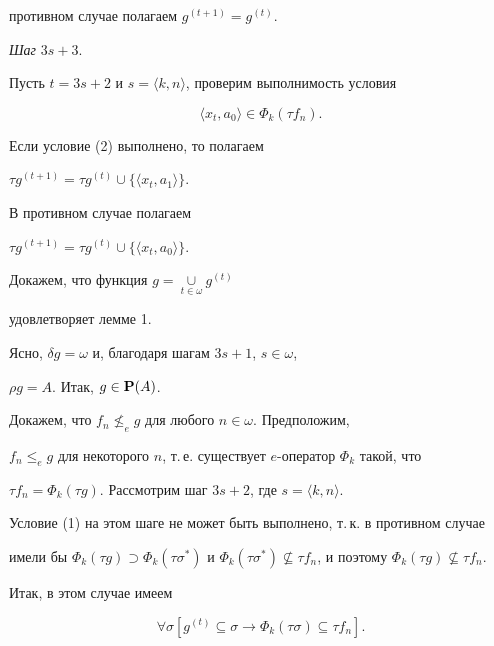 противном случае полагаем $g^{(t+1)}=g^{(t)}$.


\smallskip





{\it Шаг} $3s+3$.


Пусть $t=3s+2$ и $s=\langle k,n\rangle$, проверим выполнимость условия


\begin{equation} \label{l13}


\langle x_t,a_0\rangle\in\Phi_k(\tau f_n).


\end{equation}


Если условие (2) выполнено, то полагаем


$\tau g^{(t+1)}=\tau g^{(t)}\cup\{\langle x_t,a_1\rangle\}$.


В противном случае полагаем


$\tau g^{(t+1)}=\tau g^{(t)}\cup\{\langle x_t,a_0\rangle\}$.





Докажем, что функция $g=\mathop{\cup}\limits_{t\in\omega}g^{(t)}$


удовлетворяет лемме 1.


Ясно, $\delta g=\omega$ и, благодаря шагам $3s+1$, $s\in\omega$,


$\rho g=A$. Итак, $g\in{\bold P}(A)$.


Докажем, что $f_n\not\leq_eg$ для любого $n\in\omega$. Предположим,


$f_n\leq_eg$ для некоторого $n$, т.\,е. существует $e$-оператор $\Phi_k$ такой, что


$\tau f_n=\Phi_k(\tau g)$. Рассмотрим шаг $3s+2$, где $s=\langle k,n\rangle$.


Условие (1) на этом шаге не может быть выполнено, т.\,к. в противном случае


имели бы $\Phi_k(\tau g)\supset\Phi_k(\tau\sigma^*)$ и $\Phi_k(\tau\sigma^*)\not


\subseteq\tau f_n$, и поэтому $\Phi_k(\tau g)\not\subseteq\tau f_n$.





Итак, в этом случае имеем


\begin{equation*}  %


\forall\sigma[g^{(t)}\subseteq\sigma \to\Phi_k(\tau\sigma)\subseteq\tau f_n].


\end{equation*}


